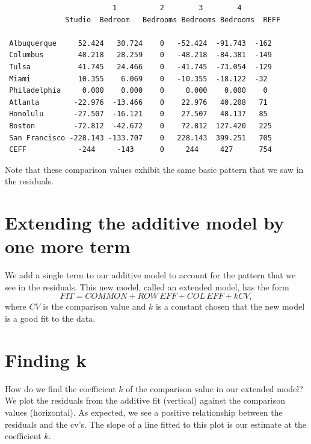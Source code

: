 \documentclass[
]{book}
\newenvironment{Shaded}{\begin{snugshade}}{\end{snugshade}}
\newcommand{\AttributeTok}[1]{\textcolor[rgb]{0.77,0.63,0.00}{#1}}
\newcommand{\FunctionTok}[1]{\textcolor[rgb]{0.00,0.00,0.00}{#1}}
\newcommand{\NormalTok}[1]{#1}
\newcommand{\OtherTok}[1]{\textcolor[rgb]{0.56,0.35,0.01}{#1}}
\newcommand{\SpecialCharTok}[1]{\textcolor[rgb]{0.00,0.00,0.00}{#1}}
\newcommand{\StringTok}[1]{\textcolor[rgb]{0.31,0.60,0.02}{#1}}
\begin{document}
\begin{verbatim}
                         1          2        3        4 
              Studio  Bedroom   Bedrooms Bedrooms Bedrooms  REFF
  
 Albuquerque     52.424   30.724    0   -52.424  -91.743  -162 
 Columbus        48.218   28.259    0   -48.218  -84.381  -149
 Tulsa           41.745   24.466    0   -41.745  -73.054  -129 
 Miami           10.355    6.069    0   -10.355  -18.122  -32 
 Philadelphia     0.000    0.000    0     0.000    0.000    0 
 Atlanta        -22.976  -13.466    0    22.976   40.208   71 
 Honolulu       -27.507  -16.121    0    27.507   48.137   85  
 Boston         -72.812  -42.672    0    72.812  127.420   225 
 San Francisco -228.143 -133.707    0   228.143  399.251   705 
 CEFF            -244     -143      0     244     427      754
\end{verbatim}

Note that these comparison values exhibit the same basic pattern that we saw in the residuals.

\hypertarget{extending-the-additive-model-by-one-more-term}{%
\section{Extending the additive model by one more term}\label{extending-the-additive-model-by-one-more-term}}

We add a single term to our additive model to account for the pattern that we see in the residuals. This new model, called an extended model, has the form
\[
FIT = COMMON + ROW \, EFF + COL \, EFF + k CV,
\]
where \(CV\) is the comparison value and \(k\) is a constant chosen that the new model is a good fit to the data.

\hypertarget{finding-k}{%
\section{Finding k}\label{finding-k}}

How do we find the coefficient \(k\) of the comparison value in our extended model? We plot the residuals from the additive fit (vertical) against the comparison values (horizontal). As expected, we see a positive relationship between the residuals and the cv's. The slope of a line fitted to this plot is our estimate at the coefficient \(k\).

\begin{Shaded}
\end{Shaded}
\end{document}

